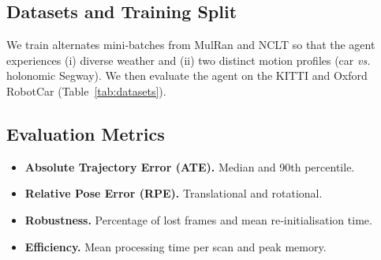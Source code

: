 \documentclass[12pt]{article}
\begin{document}
\subsection{Datasets and Training Split}
\label{sec:datasets}

\begin{table}[htbp]
    \centering
    \caption{Training, validation and Testing Datasets.}
    \label{tab:datasets}
\end{table}

We train alternates mini‑batches from MulRan and NCLT so that the agent experiences (i) diverse weather and (ii) two distinct motion profiles (car \emph{vs.} holonomic Segway). We then evaluate the agent on the KITTI and Oxford RobotCar (Table~\ref{tab:datasets}).

\subsection{Evaluation Metrics}
\label{sec:metrics}
\begin{itemize}
  \item \textbf{Absolute Trajectory Error (ATE).}  Median and 90th percentile.
  \item \textbf{Relative Pose Error (RPE).}  Translational and rotational.
  \item \textbf{Robustness.}  Percentage of lost frames and mean re‑initialisation time.
  \item \textbf{Efficiency.}  Mean processing time per scan and peak memory.
\end{itemize}
\end{document}
